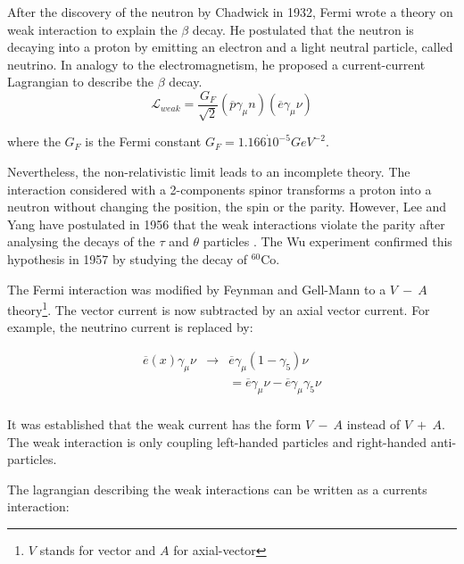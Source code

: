     After the discovery of the neutron by Chadwick in 1932, Fermi wrote a theory on weak interaction to explain the $\beta$ decay. \cite{Fermi:1934hr} 
    He postulated that the neutron is decaying into a proton by emitting an electron and a light neutral particle, called neutrino.
    In analogy to the electromagnetism, he proposed a current-current Lagrangian to describe the $\beta$ decay.
    \begin{equation}
\mathcal{L}_{weak} = \frac{G_F}{\sqrt{2}}\left(\overline{p} \gamma_{\mu} n \right) \left(\overline{e} \gamma_{\mu} \nu \right)
    \end{equation}

    where the $G_F$ is the Fermi constant $G_F = 1.166 \dot 10^{-5} GeV^{-2}$. 
    
    Nevertheless, the non-relativistic limit leads to an incomplete theory.
    The interaction considered with a 2-components spinor transforms a proton into a neutron without changing the position, the spin or the parity.
    However, Lee and Yang have postulated in 1956 that the weak interactions violate the parity after analysing the decays of the $\tau$ and $\theta$ particles \cite{1956PhRv..104..254L}.
    The Wu experiment \cite{1957PhRv..105.1413W} confirmed this hypothesis in 1957 by studying the decay of $^{60}$Co.

    The Fermi interaction was modified by Feynman and Gell-Mann\cite{PhysRev.109.193} to a $V \ - \ A$ theory\footnote{$V$ stands for vector and $A$ for axial-vector}.
    The vector current is now subtracted by an axial vector current. For example, the neutrino current is replaced by:

    \begin{equation}
        \begin{array}{rcc}
        \overline{e}(x) \gamma_{\mu} \nu & \rightarrow & \overline{e}\gamma_{\mu}(1 - \gamma_5 ) \nu \\
            & & = \overline{e} \gamma_{\mu} \nu - \overline{e}\gamma_{\mu} \gamma_5 \nu \\
        \end{array}
    \end{equation}

    It was established that the weak current has the form $V \ - \ A$ instead of $V \ + \ A$.
    The weak interaction is only coupling left-handed particles and right-handed anti-particles.
    
    The lagrangian describing the weak interactions can be written as a currents interaction:

